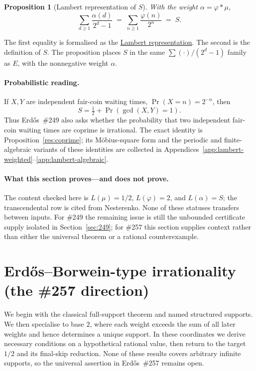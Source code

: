 \documentclass[11pt]{article}
\newcommand{\commit}{ebc98ee71f6819bd9fe344a0bb343542c604e533}
\newcommand{\repobase}{https://github.com/wcook04/plectis-lean-erdos249-257/blob/\commit}
\newcommand{\PK}{Erdos249257}
\newcommand{\lword}[4]{\href{\repobase/\PK/#1\#L#2}{#4}}
\newtheorem{proposition}[theorem]{Proposition}
\theoremstyle{definition}
\theoremstyle{remark}
\newcommand{\ph}{\varphi}
\begin{document}
\begin{proposition}[Lambert representation of \(S\)]\label{res:lift}
With the weight $\alpha=\ph*\mu$,
\[
\sum_{d\ge1}\frac{\alpha(d)}{2^d-1}\;=\;\sum_{n\ge1}\frac{\ph(n)}{2^n}\;=\;S.
\]
\end{proposition}
\noindent The first equality is formalised as the
\lword{CertificateKernel.lean}{18117}{tsum_primWeight_div_two_pow_sub_one_eq_totient_series}{Lambert representation}.
The second is the definition of \(S\).  The proposition places \(S\) in the
same \(\sum(\cdot)/(2^d-1)\) family as \(E\), with the nonnegative weight
\(\alpha\).

\paragraph{Probabilistic reading.}
If \(X,Y\) are independent fair-coin waiting times,
\(\Pr(X=n)=2^{-n}\), then
\[
 S=\tfrac12+\Pr(\gcd(X,Y)=1).
\]
Thus Erd\H{o}s~\#249 also asks whether the probability that two independent
fair-coin waiting times are coprime is irrational.  The exact identity is
Proposition~\ref{res:coprime}; its M\"obius-square form and the periodic and
finite-algebraic variants of these identities are collected in
Appendices~\ref{app:lambert-weighted}--\ref{app:lambert-algebraic}.

\paragraph{What this section proves---and does not prove.}
The content checked here is
\(L(\mu)=1/2\), \(L(\ph)=2\), and \(L(\alpha)=S\); the transcendental row is
cited from Nesterenko.  None of these statuses transfers between inputs.  For
\#249 the remaining issue is still the unbounded certificate supply isolated
in Section~\ref{sec:249}; for \#257 this section supplies context rather than
either the universal theorem or a rational counterexample.

\section{Erd\H{o}s--Borwein-type irrationality (the \#257 direction)}\label{sec:eb}

We begin with the classical full-support theorem and named structured
supports.  We then specialise to base \(2\), where each weight exceeds the sum
of all later weights and hence determines a unique support.  In these
coordinates we derive necessary conditions on a hypothetical rational value,
then return to the target \(1/2\) and its final-skip reduction.  None of these
results covers arbitrary infinite supports, so the universal assertion in
Erd\H{o}s~\#257 remains open.
\end{document}
